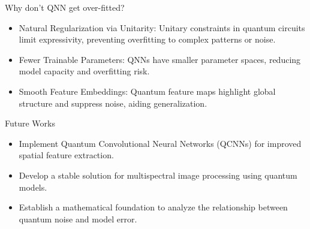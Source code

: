 \documentclass[12pt, aspectratio=169]{beamer}
\begin{document}
\begin{frame}{Why don't QNN get over-fitted?}
    \begin{itemize}
        \item Natural Regularization via Unitarity: Unitary constraints in quantum circuits limit expressivity, preventing overfitting to complex patterns or noise.
        \item Fewer Trainable Parameters: QNNs have smaller parameter spaces, reducing model capacity and overfitting risk.
        \item Smooth Feature Embeddings:  Quantum feature maps highlight global structure and suppress noise, aiding generalization.
    \end{itemize}
\end{frame}
\begin{frame}{Future Works}
    \begin{itemize}
        \item Implement Quantum Convolutional Neural Networks (QCNNs) for improved spatial feature extraction.
        \item Develop a stable solution for multispectral image processing using quantum models.
        \item Establish a mathematical foundation to analyze the relationship between quantum noise and model error.
    \end{itemize}
\end{frame}
\end{document}
